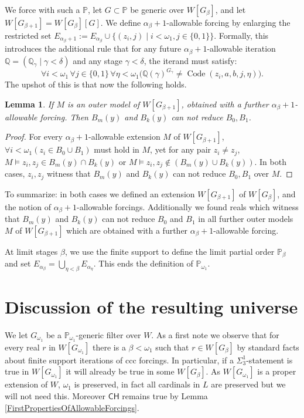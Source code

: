 \documentclass[a4paper,11pt]{article}
\newtheorem{lemma}[theorem]{Lemma}
\newcommand{\forceP}{\mathbb{P}}
\newcommand{\CH}{\mathsf{CH}}
\begin{document}
\begin{enumerate}
We force with such a $\forceP$, let $G \subset \forceP$ be generic over $W[G_{\beta}]$, and let $W[G_{\beta+1}]=W[G_{\beta}] [G]$. We define $\alpha_{\beta} +1$-allowable forcing by enlarging the restricted set $E_{\alpha_{\beta}+1} := E_{\alpha_{\beta}} \cup \{ (z_i, j) \mid i < \omega_1, j \in \{0, 1\} \}$. Formally, this introduces the additional rule that for any future $\alpha_{\beta}+1$-allowable iteration $\mathbb{Q} = (\mathbb{Q}_{\gamma} \mid \gamma < \delta)$ and any stage $\gamma < \delta$, the iterand must satisfy:
$$ \forall i < \omega_1 \, \forall j \in \{0, 1\} \, \forall \eta < \omega_1 \Big( \mathbb{Q}(\gamma)^{G_{\gamma}} \neq \operatorname{Code}(z_i, a, b, j, \eta) \Big). $$
The upshot of this is that now the following holds.

\begin{lemma}
If $M$ is an outer model of $W[G_{\beta+1}]$, obtained with a further $\alpha_{\beta}+1$-allowable forcing. Then $B_m(y)$ and $B_k (y)$ can not reduce $B_0,B_1$.

\end{lemma}
\begin{proof}
 For every $\alpha_{\beta}+1$-allowable extension $M$ of $W[G_{\beta+1}]$, $\forall i < \omega_1 (z_i \in B_0 \cup B_1)$ must hold in $M$, yet for any pair $z_i \ne z_j$,
 $M \models z_i, z_j \in B_m(y) \cap B_k (y)$ or $M \models z_i,z_j \notin (B_m(y) \cup B_k(y) ) $. In both cases, $z_i, z_j$ witness that $B_m(y)$ and $B_k(y)$ can not reduce $B_0,B_1$ over $M$.
 

\end{proof}
 
 
 To summarize: in both cases we defined an extension $W[G_{\beta+1} ]$ of $W[G_{\beta}]$, and the notion of $\alpha_{\beta}+1$-allowable forcings. Additionally we found reals which witness that $B_m(y)$ and $B_k(y)$ can not reduce $B_0$ and $B_1$ in all further outer models $M$ of $W[G_{\beta+1}]$ which are obtained with a further $\alpha_{\beta}+1$-allowable forcing. 
\end{enumerate}

At limit stages $\beta$, we use the finite support to define the limit partial order $\forceP_{\beta}$ and set $E_{\alpha_{\beta}}= \bigcup_{\eta < \beta}  E_{\alpha_{\eta}}$.
This ends the definition of $\forceP_{\omega_1}$.


\section{Discussion of the resulting universe}
We let $G_{\omega_1}$ be a $\forceP_{\omega_1}$-generic filter over $W$.
As a first note we observe that for every real $r$ in $W[G_{\omega_1}]$ there is a $\beta < \omega_1$ such that $r \in W[G_{\beta}]$ by standard facts about finite support iterations of ccc forcings. 
In particular, if a $\Sigma^1_3$-statement is true in $W[G_{\omega_1}]$ it will already be true in some $W[G_{\beta}]$.
As $W[G_{\omega_1}]$ is a proper extension of $W$, $\omega_1$ is preserved, in fact all cardinals in $L$ are preserved but we will not need this. Moreover $\CH$ remains true by Lemma \ref{FirstPropertiesOfAllowableForcings}.
\end{document}
